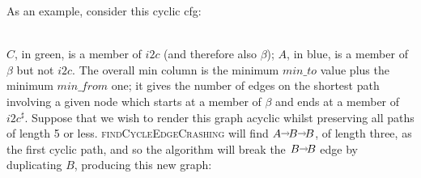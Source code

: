 \noindent
As an example, consider this cyclic \gls{cfg}:\\
\centerline{
}\\
\noindent $C$, in green, is a member of $i2c$ (and therefore also
$\beta$); $A$, in blue, is a member of $\beta$ but not $i2c$.  The
overall min column is the minimum $\mathit{min\_to}$ value plus the
minimum $\mathit{min\_from}$ one; it gives the number of edges on the
shortest path involving a given node which starts at a member of
$\beta$ and ends at a member of $i2c^\sharp$.  Suppose that we wish to
render this graph acyclic whilst preserving all paths of length 5 or
less.  \textsc{findCycleEdgeCrashing} will find $A \shortrightarrow B
\shortrightarrow B$, of length three, as the first cyclic path, and so
the algorithm will break the $B \shortrightarrow B$ edge by
duplicating $B$, producing this new graph:\\
